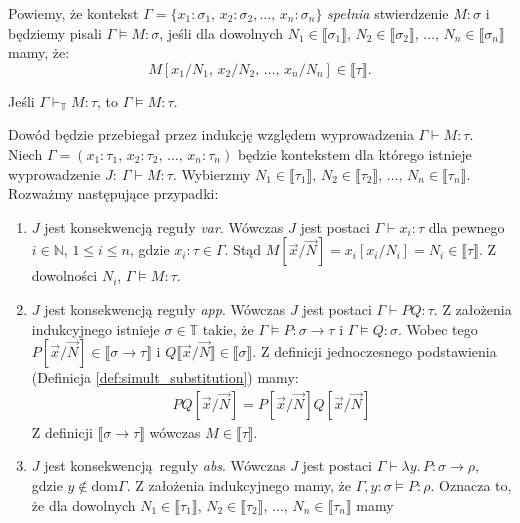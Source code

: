 \begin{definicja}
  Powiemy, że kontekst \(\Gamma=\{x_1:\sigma_1,\,x_2:\sigma_2,\dots ,\,x_n:\sigma_n\}\) \emph{spełnia} stwierdzenie \(M:\sigma\) i będziemy pisali \(\Gamma\models M:\sigma\), jeśli dla dowolnych \(N_1\in\llbracket \sigma_1 \rrbracket\), \(N_2\in\llbracket \sigma_2 \rrbracket\), \(\dots\), \(N_n\in\llbracket \sigma_n \rrbracket\) mamy, że:
  \[
    M[x_1/N_1,\,x_2/N_2,\,\dots,\,x_n/N_n]\in\llbracket \tau \rrbracket.
  \]
\end{definicja}
\begin{lemat}\label{thm:o_poprawnosci}
  Jeśli \(\Gamma\vdash_{\mathbb{T}}M:\tau\), to \(\Gamma\models M:\tau\).
\end{lemat}
\begin{dowod}
  Dowód będzie przebiegał przez indukcję względem wyprowadzenia \(\Gamma\vdash M:\tau\). Niech \(\Gamma=(x_1:\tau_1,\,x_2:\tau_2,\,\dots,\,x_n:\tau_n)\) będzie kontekstem dla którego istnieje wyprowadzenie \(J:\:\Gamma\vdash M:\tau\). Wybierzmy \(N_1\in\llbracket\tau_1 \rrbracket,\,N_2\in\llbracket\tau_2\rrbracket,\,\dots,\,N_n\in\llbracket\tau_n\rrbracket\). Rozważmy następujące przypadki:
  \begin{enumerate}[label=(\alph*)]
    \setlength\itemsep{0em}
    \item \(J\) jest konsekwencją reguły \emph{var}. Wówczas \(J\) jest postaci \(\Gamma \vdash x_i:\tau\) dla pewnego \(i\in\mathbb{N}\), \(1\leq i\leq n\), gdzie \(x_i:\tau\in\Gamma\). Stąd \(M[\vec{x}/\vec{N}]=x_i[x_i/N_i]=N_i\in\llbracket \tau \rrbracket\). Z dowolności \(N_i\), \(\Gamma\vDash M:\tau\).
    \item \(J\) jest konsekwencją reguły \emph{app}. Wówczas \(J\) jest postaci \(\Gamma\vdash PQ:\tau\). Z założenia indukcyjnego istnieje \(\sigma\in\mathbb{T}\) takie, że \(\Gamma\models P:\sigma\to\tau\) i \(\Gamma\models Q:\sigma\). Wobec tego \(P[\vec{x}/\vec{N}]\in\llbracket\sigma\to\tau\rrbracket\) i \(Q\llbracket \vec{x}/\vec{N} \rrbracket \in \llbracket \sigma \rrbracket\). Z definicji jednoczesnego podstawienia (Definicja \ref{def:simult_substitution}) mamy:
      \begin{align*}
        PQ[\vec{x}/\vec{N}]=P[\vec{x}/\vec{N}]Q[\vec{x}/\vec{N}]
      \end{align*}
      Z definicji \(\llbracket \sigma \to \tau \rrbracket\) wówczas \(M\in\llbracket \tau\rrbracket\).
    \item \(J\) jest konsekwencją reguły \emph{abs}. Wówczas \(J\) jest postaci \(\Gamma\vdash \lambda y.\,P:\sigma \to\rho\), gdzie \(y\not\in\mathrm{dom}\Gamma\). Z założenia indukcyjnego mamy, że \(\Gamma,y:\sigma\models P:\rho\). Oznacza to, że dla dowolnych \(N_1\in\llbracket\tau_1\rrbracket\), \(N_2\in\llbracket\tau_2\rrbracket\), \(\dots\), \(N_n\in\llbracket\tau_n\rrbracket\) mamy

\end{enumerate}
\end{dowod}
